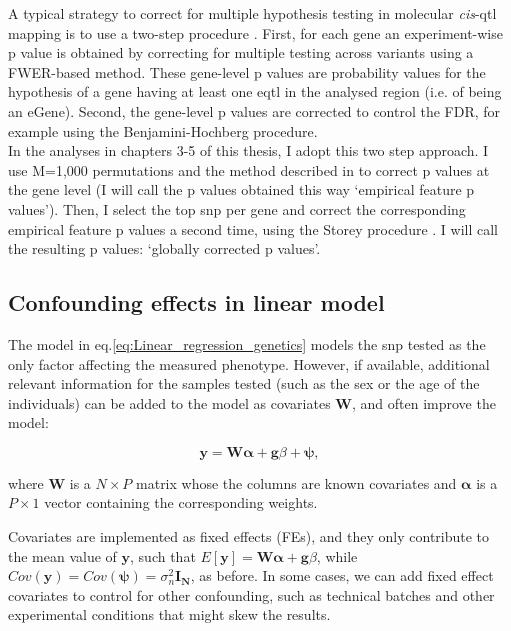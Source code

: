 A typical strategy to correct for multiple hypothesis testing in molecular \textit{cis}-\gls{qtl} mapping is to use a two-step procedure \cite{gtex2015genotype}. 
First, for each gene an experiment-wise p value is obtained by correcting for multiple testing across variants using a FWER-based method. 
These gene-level p values are probability values for the hypothesis of a gene having at least one e\gls{qtl} in the analysed region (i.e. of being an eGene). 
Second, the gene-level p values are corrected to control the FDR, for example using the Benjamini-Hochberg procedure.\\

In the analyses in chapters 3-5 of this thesis, I adopt this two step approach.
I use M=1,000 permutations and the method described in \cite{ongen2016fast} to correct p values at the gene level (I will call the p values obtained this way `empirical feature p values').
Then, I select the top \gls{snp} per gene and correct the corresponding empirical feature p values a second time, using the Storey procedure \cite{storey2002direct}.
I will call the resulting p values: `globally corrected p values'.

\subsection{Confounding effects in linear model}

The model in eq.\eqref{eq:Linear_regression_genetics} models the \gls{snp} tested as the only factor affecting the measured phenotype.
However, if available, additional relevant information for the samples tested (such as the sex or the age of the individuals) can be added to the model as covariates $\mathbf{W}$, and often improve the model:

\begin{equation}\label{eq:Linear_regression_genetics_covariates}
 \mathbf{y} =  \mathbf{W}\boldsymbol{\alpha} + \mathbf{g}\beta + \boldsymbol{\psi}, 
\end{equation}

where $\mathbf{W}$ is a $N \times P$ matrix whose the columns are known covariates and $\boldsymbol{\alpha}$ is a $P \times 1$ vector containing the corresponding weights.

Covariates are implemented as fixed effects (FEs), and they only contribute to the mean value of $\mathbf{y}$, such that $E[\mathbf{y}] = \mathbf{W}\boldsymbol{\alpha} + \mathbf{g}\beta$, while $Cov(\mathbf{y}) = Cov(\boldsymbol{\psi}) = \sigma_n^2 \mathbf{I_N} $, as before.
In some cases, we can add fixed effect covariates to control for other confounding, such as technical batches and other experimental conditions that might skew the results. \\

